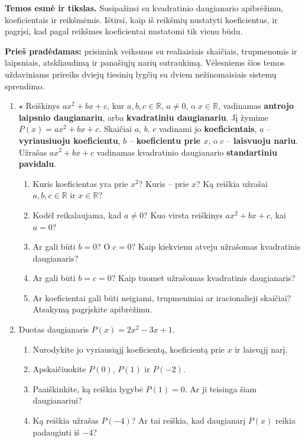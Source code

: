 \documentclass[12pt,a4paper]{exam}
\begin{document}
\textbf{Temos esmė ir tikslas.} Susipažinsi su kvadratinio daugianario apibrėžimu, koeficientais ir reikšmėmis. Ištirsi, kaip iš reikšmių nustatyti koeficientus, ir pagrįsi, kad pagal reikšmes koeficientai nustatomi tik vienu būdu.

\textbf{Prieš pradėdamas:} prisimink veiksmus su realiaisiais skaičiais, trupmenomis ir laipsniais, atskliaudimą ir panašiųjų narių sutraukimą. Vėlesniems šios temos uždaviniams prireiks dviejų tiesinių lygčių su dviem nežinomaisiais sistemų sprendimo.

\begin{enumerate}
\item $\star$ Reiškinys $ax^2+bx+c$, kur $a,b,c\in\mathbb{R}$, $a\ne0$, o $x\in\mathbb{R}$, vadinamas \textbf{antrojo laipsnio daugianariu}, arba \textbf{kvadratiniu daugianariu}. Jį žymime $P(x)=ax^2+bx+c$. Skaičiai $a$, $b$, $c$ vadinami jo \textbf{koeficientais}, $a$ – \textbf{vyriausiuoju koeficientu}, $b$ – \textbf{koeficientu prie $x$}, o $c$ – \textbf{laisvuoju nariu}. Užrašas $ax^2+bx+c$ vadinamas kvadratinio daugianario \textbf{standartiniu pavidalu}.
\begin{enumerate}
\item Kuris koeficientas yra prie $x^2$? Kuris – prie $x$? Ką reiškia užrašai $a,b,c\in\mathbb{R}$ ir $x\in\mathbb{R}$?
\item Kodėl reikalaujama, kad $a\ne0$? Kuo virsta reiškinys $ax^2+bx+c$, kai $a=0$?
\item Ar gali būti $b=0$? O $c=0$? Kaip kiekvienu atveju užrašomas kvadratinis daugianaris?
\item Ar gali būti $b=c=0$? Kaip tuomet užrašomas kvadratinis daugianaris?
\item Ar koeficientai gali būti neigiami, trupmeniniai ar iracionalieji skaičiai? Atsakymą pagrįskite apibrėžimu.
\end{enumerate}
\needspace{5cm}
\item Duotas daugianaris $P(x)=2x^2-3x+1$.
\begin{enumerate}
\item Nurodykite jo vyriausiąjį koeficientą, koeficientą prie $x$ ir laisvąjį narį.
\item Apskaičiuokite $P(0)$, $P(1)$ ir $P(-2)$.
\item Paaiškinkite, ką reiškia lygybė $P(1)=0$. Ar ji teisinga šiam daugianariui?
\item Ką reiškia užrašas $P(-4)$? Ar tai reiškia, kad daugianarį $P(x)$ reikia padauginti iš $-4$?
\end{enumerate}

\end{enumerate}
\end{document}
